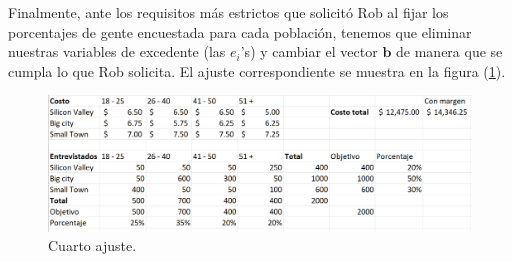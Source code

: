 \documentclass[12pt]{article}
\begin{document}
Finalmente, ante los requisitos más estrictos que solicitó Rob al fijar los porcentajes de gente encuestada para cada población, tenemos que eliminar nuestras variables de excedente (las $e_i$'s) y cambiar el vector $\pmb{b}$ de manera que se cumpla lo que Rob solicita. El ajuste correspondiente se muestra en la figura (\ref{fig:img5}).
\begin{figure}
    \centering
    \includegraphics[scale=0.4]{imgs/ajuste4.png}
    \caption{Cuarto ajuste.}    
    \label{fig:img5}   
\end{figure}

\end{document}
